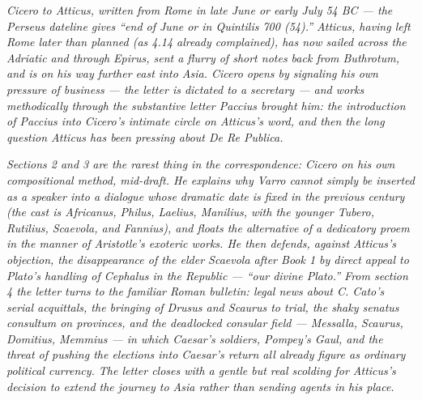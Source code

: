 
\textit{Cicero to Atticus, written from Rome in late June or early
July 54 BC --- the Perseus dateline gives ``end of June or in
Quintilis 700 (54).'' Atticus, having left Rome later than planned
(as 4.14 already complained), has now sailed across the Adriatic
and through Epirus, sent a flurry of short notes back from
Buthrotum, and is on his way further east into Asia. Cicero opens
by signaling his own pressure of business --- the letter is dictated
to a secretary --- and works methodically through the substantive
letter Paccius brought him: the introduction of Paccius into
Cicero's intimate circle on Atticus's word, and then the long
question Atticus has been pressing about \textit{De Re Publica}.}

\textit{Sections 2 and 3 are the rarest thing in the correspondence:
Cicero on his own compositional method, mid-draft. He explains why
Varro cannot simply be inserted as a speaker into a dialogue whose
dramatic date is fixed in the previous century (the cast is
Africanus, Philus, Laelius, Manilius, with the younger Tubero,
Rutilius, Scaevola, and Fannius), and floats the alternative of a
dedicatory proem in the manner of Aristotle's \textit{exoteric}
works. He then defends, against Atticus's objection, the
disappearance of the elder Scaevola after Book 1 by direct appeal
to Plato's handling of Cephalus in the \textit{Republic} ---
``our divine Plato.'' From section 4 the letter turns to the
familiar Roman bulletin: legal news about C. Cato's serial
acquittals, the bringing of Drusus and Scaurus to trial, the
shaky senatus consultum on provinces, and the deadlocked consular
field --- Messalla, Scaurus, Domitius, Memmius --- in which Caesar's
soldiers, Pompey's Gaul, and the threat of pushing the elections
into Caesar's return all already figure as ordinary political
currency. The letter closes with a gentle but real scolding for
Atticus's decision to extend the journey to Asia rather than
sending agents in his place.}
